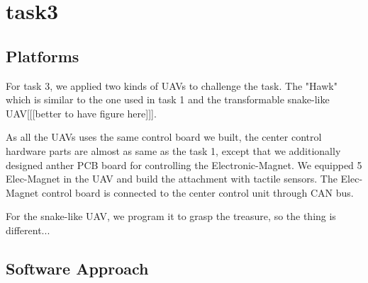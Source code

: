 \documentclass{standalone}
\begin{document}
\section{task3}
\subsection{Platforms}
For task 3, we applied two kinds of UAVs to challenge the task. The "Hawk" which is similar to the one used in task 1 and the transformable snake-like UAV[[[better to have figure here]]]. 

As all the UAVs uses the same control board we built, the center control hardware parts are almost as same as the task 1, except that we additionally designed anther PCB board for controlling the Electronic-Magnet. We equipped 5 Elec-Magnet in the UAV and build the attachment with tactile sensors. The Elec-Magnet control board is connected to the center control unit through CAN bus.

For the snake-like UAV, we program it to grasp the treasure, so the thing is different...

\subsection{Software Approach}
\end{document}
